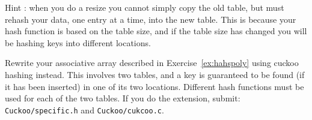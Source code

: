 Hint : when you do a resize you cannot simply
copy the old table, but must rehash your data, one entry at a time,
into the new table.  This is because your hash function is based on the
table size, and if the table size has changed you will be hashing keys
into different locations.


\begin{exercise}
Rewrite your associative array described in Exercise~\ref{ex:hahspoly}
using cuckoo hashing instead.
This involves two tables, and a key is guaranteed to be found (if it
has been inserted) in one of its two locations. Different hash functions
must be used for each of the two tables.
If you do the extension, submit:\\
\verb^Cuckoo/specific.h^ and \verb^Cuckoo/cukcoo.c^.
\end{exercise}
